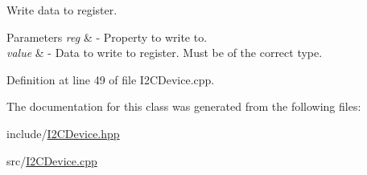 Write data to register. 


\begin{DoxyParams}{Parameters}
{\em reg} & -\/ Property to write to. \\
\hline
{\em value} & -\/ Data to write to register. Must be of the correct type. \\
\hline
\end{DoxyParams}


Definition at line 49 of file I2\+C\+Device.\+cpp.



The documentation for this class was generated from the following files\+:\begin{DoxyCompactItemize}
\item 
include/\hyperlink{_i2_c_device_8hpp}{I2\+C\+Device.\+hpp}\item 
src/\hyperlink{_i2_c_device_8cpp}{I2\+C\+Device.\+cpp}\end{DoxyCompactItemize}
